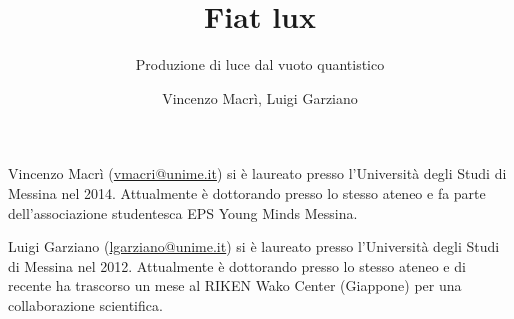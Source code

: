 ﻿\title{Fiat lux}
\subtitle{Produzione di luce dal vuoto quantistico}
\suptitle{\phantom{x}}
\author{Vincenzo Macrì, Luigi Garziano}
\maketitle
\begin{small}
\pichskip{4mm}
\nobalance



\vfill
\begin{thebiography}{}%
Vincenzo Macrì (\url{vmacri@unime.it}) si è laureato presso l'Università degli Studi di Messina nel 2014. Attualmente è dottorando presso lo stesso ateneo e fa parte dell'associazione studentesca EPS Young Minds Messina.

Luigi Garziano (\url{lgarziano@unime.it}) si è laureato presso l'Università degli Studi di Messina nel 2012.
Attualmente è dottorando presso lo stesso ateneo e di recente ha trascorso un mese al RIKEN Wako Center (Giappone) per una collaborazione scientifica.
\end{thebiography}
\end{small}

